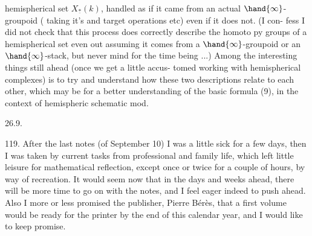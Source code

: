 
hemispherical set $X_{\underline{*}}(k)$, handled as if it came from an actual $\hand{\infty}$-groupoid
( taking it's  and target operations etc) even if it does not. (I con-%
fess I did not check that this process does correctly describe the homoto\unsure{-}%
py groups of a hemispherical set\hand{,} even out assuming it comes from
a $\hand{\infty}$-groupoid or an $\hand{\infty}$-stack, but never mind for the time being ...)
Among the interesting things still ahead (once we get a little  accus-%
tomed working with hemispherical complexes) is to try and understand how
these two descriptions relate to each other, which may be  for 
 a better understanding of the basic formula (9), in the context of
hemispheric schematic mod.


26.9.

119. After the last notes (of September 10) I was a little sick for a
few days, then I was taken by current tasks from professional and family
life, which left little leisure for mathematical reflection, except once
or twice for a couple of hours, by way of recreation. It would seem now
that in the days and weeks ahead, there will be more time to go on with
the notes, and I feel eager indeed to push ahead. Also I more or less
promised the publisher, Pierre Bérès, that a first volume would be ready
for the printer by the end of this calendar year, and I would like to
keep promise.

